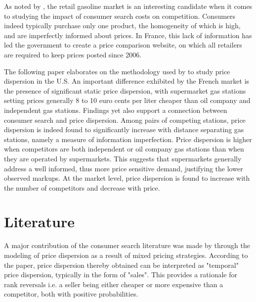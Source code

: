 \documentclass[english]{article}
\begin{document}
As noted by \cite{TAP11}, the retail gasoline market is an interesting candidate when it comes to studying the impact of consumer search costs on competition. Consumers indeed typically purchase only one product, the homogeneity of which is high, and are imperfectly informed about prices. In France, this lack of information has led the government to create a price comparison website, on which all retailers are required to keep prices posted since 2006.

The following paper elaborates on the methodology used by \cite{TAP11} to study price dispersion in the U.S. An important difference exhibited by the French market is the presence of significant static price dispersion, with supermarket gas stations setting prices generally 8 to 10 euro cents per liter cheaper than oil company and independent gas stations. Findings yet also support a connection between consumer search and price dispersion. Among pairs of competing stations, price dispersion is indeed found to significantly increase with distance separating gas stations, namely a measure of information imperfection. Price dispersion is higher when competitors are both independent or oil company gas stations than when they are operated by supermarkets. This suggests that supermarkets generally address a well informed, thus more price sensitive demand, justifying the lower observed markups. At the market level, price dispersion is found to increase with the number of competitors and decrease with price.

\section{Literature}

A major contribution of the consumer search literature was made by \cite{VAR80} through the modeling of price dispersion as a result of mixed pricing strategies. According to the paper, price dispersion thereby obtained can be interpreted as "temporal" price dispersion, typically in the form of "sales". This provides a rationale for rank reversals i.e. a seller being either cheaper or more expensive than a competitor, both with positive probabilities.
\end{document}
